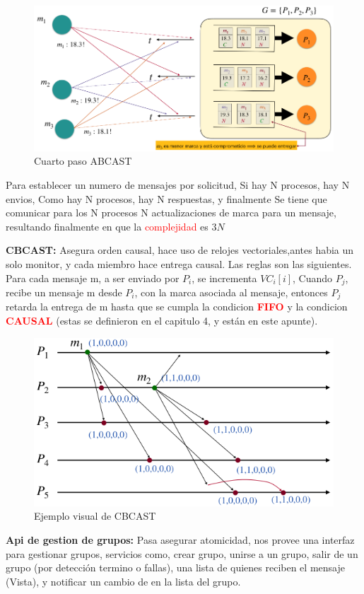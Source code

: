 \begin{figure}[H]
    \centering
    \includegraphics[width=0.7\linewidth]{img/Cuarto_paso.png}
    \caption{Cuarto paso ABCAST}\label{fig:1761653182730}
\end{figure}

Para establecer un numero de mensajes por solicitud, Si hay N procesos, hay N envios, Como hay N procesos, hay N respuestas, y finalmente Se tiene que comunicar para los N procesos N actualizaciones de marca para un mensaje, resultando finalmente en que la \textcolor{red}{complejidad} es $3N$


\textbf{CBCAST:} Asegura orden causal, hace uso de relojes vectoriales,antes habia un solo monitor, y cada miembro hace entrega causal. Las reglas son las siguientes. Para cada mensaje m, a ser enviado por $P_i$, se incrementa $VC_i[i]$, Cuando $P_j$,  recibe un mensaje m desde $P_i$, con la marca asociada al mensaje, entonces $P_j$ retarda la entrega de m hasta que se cumpla la condicion \textcolor{red}{\textbf{FIFO}} y la condicion \textcolor{red}{\textbf{CAUSAL}} (estas se definieron en el capitulo 4, y están en este apunte).

\begin{figure}[H]
    \centering
    \includegraphics[width=0.7\linewidth]{img/CBCAST.png}
    \caption{Ejemplo visual de CBCAST}\label{fig:1761675486364}
\end{figure}

\textbf{Api de gestion de grupos:} Pasa asegurar atomicidad, nos provee una interfaz para gestionar grupos, servicios como, crear grupo, unirse a un grupo, salir de un grupo (por detección termino o fallas), una lista de quienes reciben el mensaje (Vista), y notificar un cambio de en la lista del grupo.

